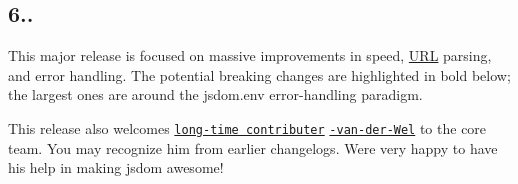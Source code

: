 \subsection*{6..}

This major release is focused on massive improvements in speed, \mbox{\hyperlink{namespace_u_r_l}{U\+RL}} parsing, and error handling. The potential breaking changes are highlighted in bold below; the largest ones are around the {\ttfamily jsdom.\+env} error-\/handling paradigm.

This release also welcomes \href{https://github.com/tmpvar/jsdom/commits/master?author=Joris-van-der-Wel}{\tt long-\/time contributer} \href{https://github.com/Joris-van-der-Wel/}{\tt -\/van-\/der-\/\+Wel} to the core team. You may recognize him from earlier changelogs. We\textquotesingle{}re very happy to have his help in making jsdom awesome!


